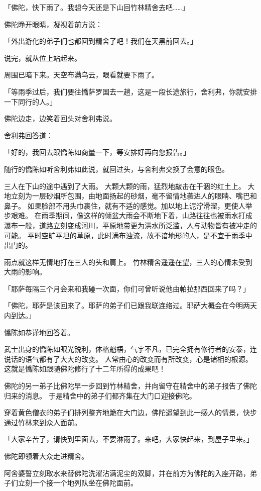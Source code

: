 \documentclass[twoside,openany]{book}
\begin{document}
「佛陀，快下雨了。我想今天还是下山回竹林精舍去吧……」

佛陀睁开眼睛，凝视着前方说：

「外出游化的弟子们也都回到精舍了吧！我们在天黑前回去。」

说完，就从位上站起来。

周围已暗下来。天空布满乌云，眼看就要下雨了。

「等雨季过后，我们要往憍萨罗国去一趟，这是一段长途旅行，舍利弗，你就安排一下同行的人。」

佛陀边走，边笑着回头对舍利弗说。

舍利弗回答道：

「好的，我回去跟憍陈如商量一下，等安排好再向您报告。」

随行的憍陈如听舍利弗如此说，就回过头，与舍利弗交换了会意的眼色。

三人在下山的途中遇到了大雨。
大颗大颗的雨，猛烈地敲击在干涸的红土上。
大地立刻为一层砂烟所包围，由地面扬起的砂烟，毫不留情地袭进人的眼睛、嘴巴和鼻子。
如果脸部不用头巾裹住，就有不适的感觉。加以地上泥泞滑溜，更使人举步艰难。
在雨季期间，像这样的倾盆大雨会不断地下着，山路往往也被雨水打成瀑布一般，道路立刻变成河川，平原地带更为洪水所泛滥，人与动物皆有被冲走的可能。
平时空旷平坦的草原，此时满布浊流，故不谙地形的人，是不宜于雨季中出门的。

雨点就这样无情地打在三人的头和肩上。
竹林精舍遥遥在望，三人的心情未受到大雨的影响。

「耶萨每隔三个月会来和我碰一次面，你们可曾听说他由帕拉那西回来了吗？」

「佛陀，耶萨是该回来了。耶萨的弟子们已跟我联连络过。耶萨大概会在今明两天内到达。」

憍陈如恭谨地回答着。

武士出身的憍陈如眼光锐利，体格魁梧，气宇不凡，已完全拥有修行者的安泰，连说话的语气都有了大大的改变。
人常由心的改变而有所改变，心是诸相的根源。
这就是憍陈如跟随佛陀修行了十二年所得的成果吧！

佛陀的另一弟子比佛陀早一步回到竹林精舍，并向留守在精舍中的弟子报告了佛陀归来的消息。
于是精舍中的弟子们都齐集在大门口迎接佛陀。

穿着黄色僧衣的弟子们排列整齐地跪在大门边，佛陀遥望到此一感人的情景，快步通过竹林来到众人面前。

「大家辛苦了，请快到里面去，不要淋雨了。来吧，大家快起来，到屋子里来。」

佛陀即领着大众走进精舍。

阿舍婆誓立刻取水来替佛陀洗濯沾满泥尘的双脚，并在前方为佛陀的入座开路，弟子们立刻一个接一个地列队坐在佛陀面前。
\end{document}
